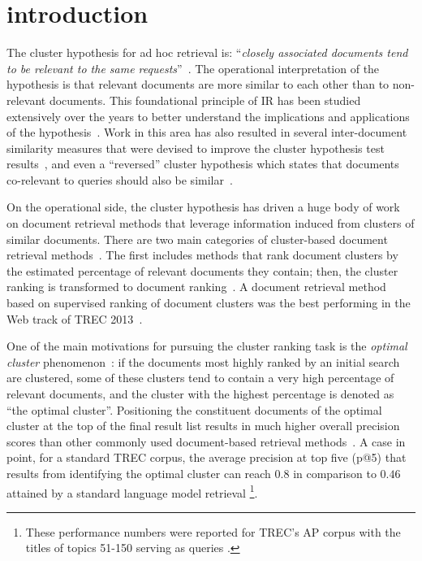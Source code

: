 \section{introduction}
\label{sec:intro}

The cluster hypothesis for ad hoc retrieval is: ``{\em closely
associated documents tend to be relevant to the same
requests}''~{\cite{Jardine+Rijsbergen:71a}}.
The operational interpretation of the hypothesis is that relevant
documents are more similar to each other than to non-relevant
documents.
This foundational principle of IR has been studied extensively over
the years to better understand the implications and
applications of the
hypothesis~{\cite{Jardine+Rijsbergen:71a,Voorhees:85a,elHamdouchi+Willett:87a,Crestani+Wu:06a,Smucker+Allan:09a,Raiber+Kurland:14c}}.
Work in this area has also resulted in several inter-document similarity
measures that were devised to improve the cluster hypothesis test
results~\cite{Tombros+Villa+Rijsbergen:02a,Raiber+al:15a}, and even a
``reversed'' cluster hypothesis which states that documents
co-relevant to queries should also be similar~\cite{Fuhr+al:12a}.

On the operational side, the cluster hypothesis has driven a huge
body of work on document retrieval methods that leverage information
induced from clusters of similar documents.
There are two main categories of cluster-based document retrieval
methods~\cite{Kurland+Lee:04a}.
The first includes methods that rank document clusters by the
estimated percentage of relevant documents they contain; then, the
cluster ranking is transformed to document
ranking~\cite{Jardine+Rijsbergen:71a,Croft:80a,Voorhees:85a,elHamdouchi+Willett:89a,Tombros+Villa+Rijsbergen:02a,Kurland+Lee:04a,Liu+Croft:04a,Kurland+Lee:06a,Liu+Croft:06a,Liu+Croft:06b,Liu+Croft:08a,Kurland+Domshlak:08a,Kurland+Krikon:11a,Raiber+Kurland:13a}.
A document retrieval method based on supervised ranking of document
clusters was the best performing in the Web track of TREC
2013~\cite{Thompson+al:13a}.

One of the main motivations for pursuing the cluster ranking task is
the {\em optimal cluster}
phenomenon~\cite{Cutting+al:92a,Tombros+Villa+Rijsbergen:02a,Liu+Croft:06b,Kurland+Domshlak:08a}:
if the documents most highly ranked by an initial search are
clustered, some of these clusters tend to contain a very high percentage of
relevant documents, and the cluster with the highest percentage is
denoted as ``the optimal cluster''.
Positioning the constituent documents of the optimal cluster at the
top of the final result list results in much higher overall precision
scores than other commonly used document-based retrieval
methods~\cite{Tombros+Villa+Rijsbergen:02a,Liu+Croft:06b,Kurland+Domshlak:08a}.
A case in point, for a standard TREC corpus, the average precision at
top five (p@5) that results from identifying the optimal
cluster can reach $0.8$ in comparison to $0.46$ attained by a
standard language model retrieval
\cite{Kurland+Domshlak:08a}\footnote{These performance numbers were
reported for TREC's AP corpus with the titles of topics 51-150
serving as queries \cite{Kurland+Domshlak:08a}.}.

